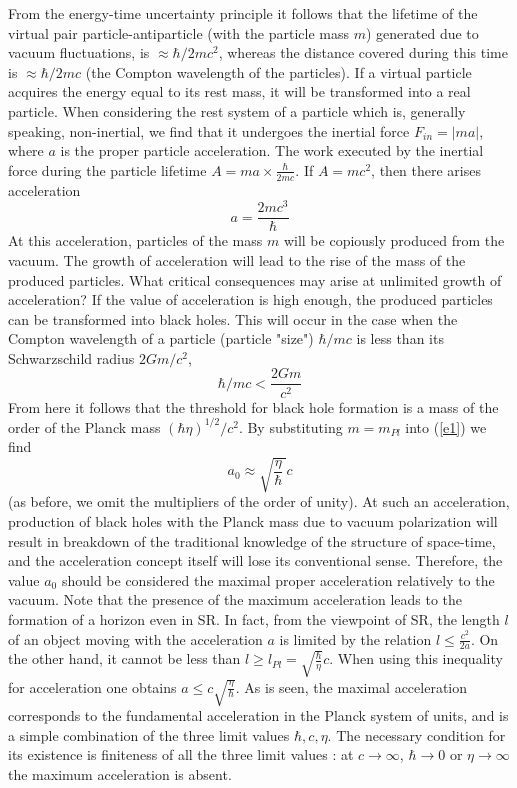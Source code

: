 \documentclass [12pt]{article}
\begin{document}
From the energy-time uncertainty principle it follows that the lifetime of the virtual pair  particle-antiparticle (with the particle mass $m$) generated due to vacuum fluctuations, is  $ \approx \hbar /2m{c^2}$, whereas the distance covered during this time is $ \approx \hbar /2mc$ (the Compton wavelength of the particles). If a virtual particle acquires  the energy equal to its rest mass, it will be transformed into a real particle. When considering the rest system of a particle which is, generally speaking, non-inertial, we find that it undergoes the  inertial  force  ${F_{in}} = \left| {ma} \right|$, where $a$ is  the proper particle acceleration. The work executed by the inertial force during the particle lifetime  $A = ma \times \frac{\hbar }{{2mc}}$. If  $A = m{c^2}$, then there arises  acceleration
\begin{equation}\label{e35}
  a = \frac{{2m{c^3}}}{\hbar }
\end{equation}
At this acceleration, particles of the mass  $m$ will be copiously produced from  the vacuum.  The growth of acceleration will lead to the rise of the mass of the produced particles. What critical consequences may  arise at unlimited growth of acceleration?  If the value of acceleration is high enough, the produced particles can  be transformed into black holes. This will occur in the case when the Compton wavelength of a particle  (particle "size") $\hbar /mc$ is less than its  Schwarzschild radius $2Gm/{c^2}$,
\begin{equation}\label{e36}
  \hbar /mc < \frac{{2Gm}}{{{c^2}}}
\end{equation}
From here it follows that the threshold for black hole formation is a mass of the order of the Planck mass  ${\left( {\hbar \eta } \right)^{1/2}}/{c^2}$. By substituting  $m = {m_{Pl}}$ into  (\ref{e1}) we find
\begin{equation}\label{e37}
  {a_0} \approx \sqrt {\frac{\eta }{\hbar }\,} c
\end{equation}
(as before, we omit the multipliers of the order of unity). At such an acceleration, production of black holes with the  Planck mass due to vacuum polarization will result in breakdown of the traditional knowledge of the structure of space-time, and the acceleration concept itself will lose its conventional sense.  Therefore, the value  ${a_0}$ should be considered the maximal proper acceleration relatively to the vacuum. Note that the presence of the maximum acceleration leads to the formation of a horizon even in SR. In fact, from the viewpoint of SR, the length $l$ of an object moving with the acceleration  $a$ is limited by the relation  $l \le \frac{{{c^2}}}{{2a}}$. On the other hand, it cannot be less than  $l \ge {l_{Pl}} = \sqrt {\frac{\hbar }{\eta }} c$. When  using this inequality for acceleration one obtains  $a \le c\sqrt {\frac{\eta }{\hbar }}$. As is seen, the maximal acceleration corresponds to the fundamental acceleration in the Planck system of units, and is a simple combination of the three limit values $\hbar, c, \eta $.  The necessary condition for its existence is finiteness of all the three limit values : at $c \to \infty $, $\hbar  \to 0$ or  $\eta  \to \infty $ the maximum acceleration is absent.
\end{document}
